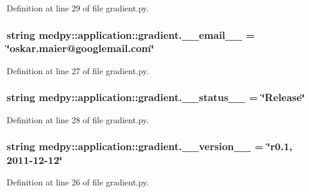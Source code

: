 Definition at line 29 of file gradient.py.

\hypertarget{namespacemedpy_1_1application_1_1gradient_aac896da6093b760d4a08d353cd3f9ec5}{
\subsubsection[{\_\-\_\-email\_\-\_\-}]{\setlength{\rightskip}{0pt plus 5cm}string {\bf medpy::application::gradient.\_\-\_\-email\_\-\_\-} = \char`\"{}oskar.maier@googlemail.com\char`\"{}}}
\label{namespacemedpy_1_1application_1_1gradient_aac896da6093b760d4a08d353cd3f9ec5}


Definition at line 27 of file gradient.py.

\hypertarget{namespacemedpy_1_1application_1_1gradient_af40fcbc5d5736dcdd259c38727bf4675}{
\subsubsection[{\_\-\_\-status\_\-\_\-}]{\setlength{\rightskip}{0pt plus 5cm}string {\bf medpy::application::gradient.\_\-\_\-status\_\-\_\-} = \char`\"{}Release\char`\"{}}}
\label{namespacemedpy_1_1application_1_1gradient_af40fcbc5d5736dcdd259c38727bf4675}


Definition at line 28 of file gradient.py.

\hypertarget{namespacemedpy_1_1application_1_1gradient_a10f82a37bc73425c1d34010f2e630184}{
\subsubsection[{\_\-\_\-version\_\-\_\-}]{\setlength{\rightskip}{0pt plus 5cm}string {\bf medpy::application::gradient.\_\-\_\-version\_\-\_\-} = \char`\"{}r0.1, 2011-\/12-\/12\char`\"{}}}
\label{namespacemedpy_1_1application_1_1gradient_a10f82a37bc73425c1d34010f2e630184}


Definition at line 26 of file gradient.py.

